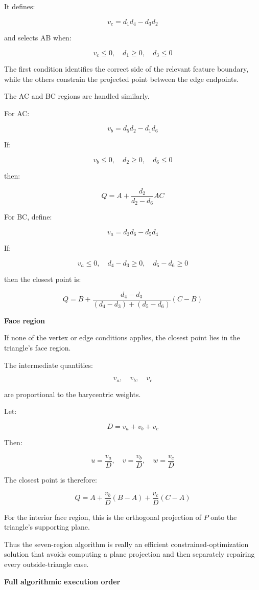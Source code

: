 It defines:

\[
v_c=d_1d_4-d_3d_2
\]

and selects AB when:

\[
v_c\le0,\quad d_1\ge0,\quad d_3\le0
\]

The first condition identifies the correct side of the relevant feature boundary, while the others constrain the projected point between the edge endpoints.

The AC and BC regions are handled similarly.

For AC:

\[
v_b=d_5d_2-d_1d_6
\]

If:

\[
v_b\le0,\quad d_2\ge0,\quad d_6\le0
\]

then:

\[
\boxed{ Q=A+\frac{d_2}{d_2-d_6}AC }
\]

For BC, define:

\[
v_a=d_3d_6-d_5d_4
\]

If:

\[
v_a\le0,\quad d_4-d_3\ge0,\quad d_5-d_6\ge0
\]

then the closest point is:

\[
\boxed{ Q=B+ \frac{d_4-d_3} {(d_4-d_3)+(d_5-d_6)} (C-B) }
\]

\textbf{Face region}

If none of the vertex or edge conditions applies, the closest point lies in the triangle's face region.

The intermediate quantities:

\[
v_a,\quad v_b,\quad v_c
\]

are proportional to the barycentric weights.

Let:

\[
D=v_a+v_b+v_c
\]

Then:

\[
u=\frac{v_a}{D},\quad v=\frac{v_b}{D},\quad w=\frac{v_c}{D}
\]

The closest point is therefore:

\[
\boxed{ Q=A+\frac{v_b}{D}(B-A)+\frac{v_c}{D}(C-A) }
\]

For the interior face region, this is the orthogonal projection of \(P\) onto the triangle's supporting plane.

Thus the seven-region algorithm is really an efficient constrained-optimization solution that avoids computing a plane projection and then separately repairing every outside-triangle case.

\textbf{Full algorithmic execution order}

